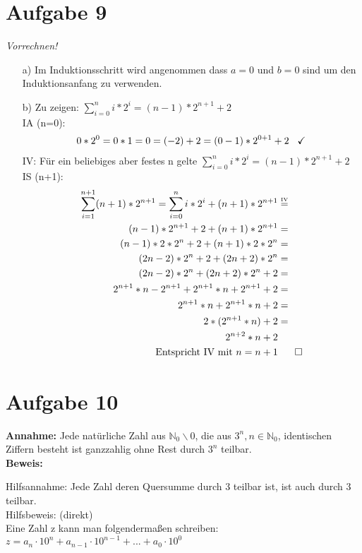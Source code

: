 \documentclass[paper = a4, ngerman]{scrartcl}
\begin{document}
	\section*{Aufgabe 9}
	\textit{Vorrechnen!}
		\begin{itemize}
			\item[a)] Im Induktionsschritt wird angenommen dass $a=0$ und $b=0$ sind um den Induktionsanfang zu verwenden.
			\item[b)] Zu zeigen: $\displaystyle\sum_{i=0}^{n} i*2^i = (n-1)*2^{n+1}+2$\\
			IA (n=0):
			\begin{align*}
			0*2^0 = 0*1 = 0 = (-2) + 2 = (0-1)*2^{0+1}+2 \hspace{3mm}\checkmark
			\end{align*}
			IV: Für ein beliebiges aber festes n gelte $\displaystyle\sum_{i=0}^{n} i*2^i = (n-1)*2^{n+1}+2$\\
			IS (n+1):
			\begin{align*}
			\displaystyle\sum_{i=1}^{n+1} (n+1)*2^{n+1} = \sum_{i=0}^{n} i*2^i + (n+1)*2^{n+1} &\overset{\text{\tiny{IV}}}{=}\\
			(n-1)*2^{n+1}+2+(n+1)*2^{n+1} &=\\
			(n-1)*2*2^{n}+2+(n+1)*2*2^n &=\\
			(2n-2)*2^{n}+2+(2n+2)*2^n &=\\
			(2n-2)*2^{n}+(2n+2)*2^n + 2 &=\\
			2^{n+1}*n-2^{n+1}+2^{n+1}*n+2^{n+1}+2 &=\\
			2^{n+1}*n+2^{n+1}*n+2 &=\\
			2*(2^{n+1}*n)+2 &=\\
			2^{n+2}*n+2 &\\
			\text{Entspricht IV mit } n=n+1& \hspace{6mm} \Box
			\end{align*}
		\end{itemize}
	
\section*{Aufgabe 10}

\textbf{Annahme:} Jede natürliche Zahl aus $\mathbb{N}_0\backslash{0}$, die aus $3^n, n \in \mathbb{N}_0 $, identischen Ziffern besteht ist ganzzahlig ohne Rest durch $3^n$ teilbar.\\

\textbf{Beweis:}

Hilfsannahme: Jede Zahl deren Quersumme durch 3 teilbar ist, ist auch durch 3 teilbar.\\
Hilfsbeweis:  (direkt)\\
Eine Zahl z kann man folgendermaßen schreiben:\\ 
$z = a_n \cdot 10^n + a_{n-1} \cdot 10^{n-1} + ... + a_0 \cdot 10^0$\\
\end{document}
